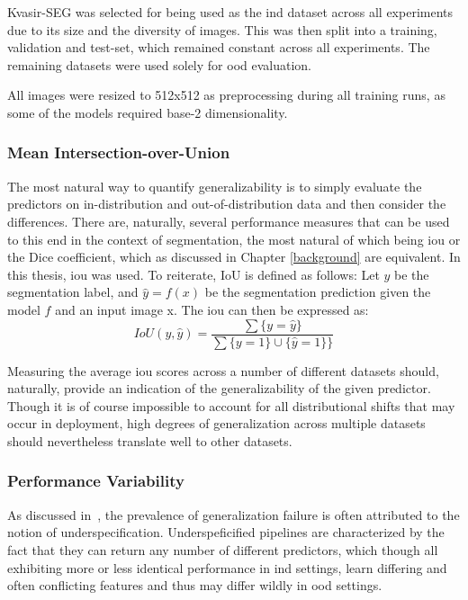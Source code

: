     Kvasir-SEG was selected for being used as the \gls{ind} dataset across all experiments due to its size and the diversity of images. This was then split into a training, validation and test-set, which remained constant across all experiments. The remaining datasets were used solely for \gls{ood} evaluation.
    
    All images were resized to 512x512 as preprocessing during all training runs, as some of the models required base-2 dimensionality.
    
    \subsubsection{Mean Intersection-over-Union}
    
    The most natural way to quantify generalizability is to simply evaluate the predictors on in-distribution and out-of-distribution data and then consider the differences. There are, naturally, several performance measures that can be used to this end in the context of segmentation, the most natural of which being \gls{iou} or the Dice coefficient, which as discussed in Chapter \ref{background} are equivalent. In this thesis, \gls{iou} was used. To reiterate, IoU is defined as follows:
    Let \(y\) be the segmentation label, and \(\hat{y}=f(x)\) be the segmentation prediction given the model \(f\) and an input image x. The \gls{iou} can then be expressed as: 
    \begin{equation*}
        IoU(y, \hat{y}) = \frac{\sum \{y=\hat{y}\} }{\sum \{y=1\} \cup \{\hat{y}=1\}\}}
    \end{equation*}
    
    Measuring the average \gls{iou} scores across a number of different datasets should, naturally, provide an indication of the generalizability of the given predictor. Though it is of course impossible to account for all distributional shifts that may occur in deployment, high degrees of generalization across multiple datasets should nevertheless translate well to other datasets. 

    
    \subsubsection{Performance Variability}
    As discussed in~, the prevalence of generalization failure is often attributed to the notion of underspecification. Underspeficified pipelines are characterized by the fact that they can return any number of different predictors, which though all exhibiting more or less identical performance in \gls{ind} settings, learn differing and often conflicting features and thus may differ wildly in \gls{ood} settings. 
    
